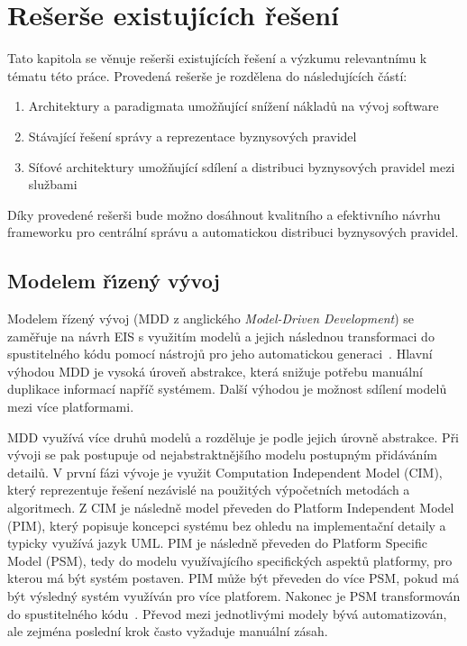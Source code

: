 
\chapter{Rešerše existujících řešení}\label{ch:reserse}

Tato kapitola se věnuje rešerši existujících řešení a výzkumu relevantnímu k tématu této práce.
Provedená rešerše je rozdělena do následujících částí:

\begin{enumerate}
    \item Architektury a paradigmata umožňující snížení nákladů na vývoj software
    \item Stávající řešení správy a reprezentace byznysových pravidel
    \item Síťové architektury umožňující sdílení a distribuci byznysových pravidel mezi službami
\end{enumerate}

Díky provedené rešerši bude možno dosáhnout kvalitního a efektivního návrhu
frameworku pro centrální správu a automatickou distribuci byznysových pravidel.

\section{Modelem ř\'{\i}zený vývoj}

Modelem řízený vývoj (\gls{MDD} z anglického \textit{Model-Driven
Development}) se zaměřuje na návrh \gls{EIS} s využitím modelů a jejich
následnou transformaci do spustitelného kódu pomocí nástrojů pro jeho automatickou
generaci~\cite{selic2003pragmatics, soley2000model}. Hlavní výhodou \gls{MDD} je vysoká
úroveň abstrakce, která snižuje potřebu manuální duplikace informací napříč systémem.
Další výhodou je možnost sdílení modelů mezi více platformami.

\gls{MDD} využívá více druhů modelů a rozděluje je podle jejich úrovně abstrakce.
Při vývoji se pak postupuje od nejabstraktnějšího modelu postupným přidáváním detailů.
V první fázi vývoje je využit Computation Independent Model (\gls{CIM}), který reprezentuje
řešení nezávislé na použitých výpočetních metodách a algoritmech. Z \gls{CIM} je
následně model převeden do Platform Independent Model (\gls{PIM}),
který popisuje koncepci systému bez ohledu na implementační detaily a typicky
využívá jazyk \gls{UML}. \gls{PIM} je následně převeden do
Platform Specific Model (\gls{PSM}), tedy do modelu využívajícího
specifických aspektů platformy, pro kterou má být systém postaven.
\gls{PIM} může být převeden do více \gls{PSM}, pokud má být výsledný systém využíván pro více platforem.
Nakonec je \gls{PSM} transformován do spustitelného kódu~\cite{kleppe2003model}.
Převod mezi jednotlivými modely bývá automatizován, ale zejména poslední krok
často vyžaduje manuální zásah.


